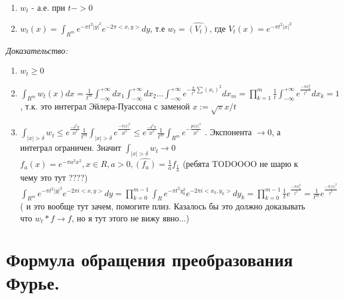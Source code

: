 \documentclass[paper=a4, fontsize=17pt]{article}
\begin{document}
\begin{enumerate}
	\item ${w_t}$ - а.е. при $t->0$
	\item $w_t(x) = \int_{R^m} e^{-\pi t^2 |y|^2} e^{-2\pi <x, y>} dy$, т.е $w_t = \hat{(V_t)}$, где $V_t(x) = e^{-\pi t^2 |x|^2}$
\end{enumerate}
\emph{Доказательство:}
\begin{enumerate}
	\item $w_t \geq 0$
	\item $\int_{R^m} w_t(x) dx = \frac{1}{t^m}\int_{-\infty}^{+\infty} dx_1 \int_{-\infty}^{+\infty} dx_2 \dots \int_{-\infty}^{+\infty} e^{-\frac{\pi}{t^2} \sum (x_i)^2} dx_m = \prod_{k=1}^{m} \frac{1}{t} \int_{-\infty}^{+\infty} e^{\frac{-\pi x_k^2}{t^2}} dx_k = 1$, т.к. это интеграл Эйлера-Пуассона с заменой $x := \sqrt\pi x / t$
	\item $\int_{|x| > \delta} w_t \leq e^{\frac{-\delta^2 \pi}{2 t^2}} \frac{1}{t^m} \int_{|x| > \delta} e^{\frac{-\pi |x|^2}{2 t^2}} \leq e^{\frac{-\delta^2 \pi}{2 t^2}} \frac{1}{t^m} \int_{R^m} e^{-\frac{pi |x|^2}{2t^2}}$ . Экспонента $\rightarrow 0$, а интеграл ограничен. Значит $\int_{|x| > \delta} w_t \rightarrow 0$ \\
	$f_a(x) = e^{-\pi a^2 x^2}, x \in R, a > 0, \hat{(f_a)} = \frac{1}{a} f_{\frac{1}{a}}$ (ребята TODOOOO не шарю к чему это тут ????)\\ 
	$\int_{R^m} e^{-\pi t^2 |y|^2} e^{- 2 \pi i <x, y>} dy = \prod_{k=0}^{m-1} \int_{R} e^{-\pi t^2 y_k^2} e^{- 2 \pi i <x_k, y_k>} dy_k = \prod_{k=0}^{m-1} \frac{1}{t} e^{\frac{-\pi x_k^2}{t^2}} = \frac{1}{t^m} e^{\frac{-\pi |x|^2}{t^2}}$  ( и это вообще тут зачем, помогите плиз. Казалось бы это должно доказывать что $w_t * f \rightarrow f$, но я тут этого не вижу явно...)
	
\end{enumerate}


\section{Формула обращения преобразования Фурье.}
\end{document}
